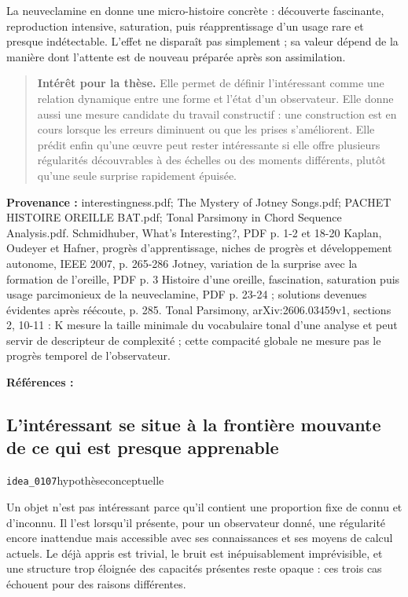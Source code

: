 \documentclass[10pt,a4paper]{article}
\begin{document}
La neuveclamine en donne une micro-histoire concrète : découverte fascinante, reproduction intensive, saturation, puis réapprentissage d'un usage rare et presque indétectable. L'effet ne disparaît pas simplement ; sa valeur dépend de la manière dont l'attente est de nouveau préparée après son assimilation.

\begin{quote}
\textbf{Intérêt pour la thèse.} Elle permet de définir l'intéressant comme une relation dynamique entre une forme et l'état d'un observateur. Elle donne aussi une mesure candidate du travail constructif : une construction est en cours lorsque les erreurs diminuent ou que les prises s'améliorent. Elle prédit enfin qu'une œuvre peut rester intéressante si elle offre plusieurs régularités découvrables à des échelles ou des moments différents, plutôt qu'une seule surprise rapidement épuisée.
\end{quote}
{\footnotesize\color{metadata}\textbf{Provenance :} interestingness.pdf; The Mystery of Jotney Songs.pdf; PACHET HISTOIRE OREILLE BAT.pdf; Tonal Parsimony in Chord Sequence Analysis.pdf. Schmidhuber, What's Interesting?, PDF p. 1-2 et 18-20 Kaplan, Oudeyer et Hafner, progrès d'apprentissage, niches de progrès et développement autonome, IEEE 2007, p. 265-286 Jotney, variation de la surprise avec la formation de l'oreille, PDF p. 3 Histoire d'une oreille, fascination, saturation puis usage parcimonieux de la neuveclamine, PDF p. 23-24 ; solutions devenues évidentes après réécoute, p. 285. Tonal Parsimony, arXiv:2606.03459v1, sections 2, 10-11 : K mesure la taille minimale du vocabulaire tonal d'une analyse et peut servir de descripteur de complexité ; cette compacité globale ne mesure pas le progrès temporel de l'observateur.\par}
{\footnotesize\color{metadata}\textbf{Références :} \parencite{schmidhuber1997interesting,schmidhuber2009compression,oudeyer2007intrinsic,oudeyer2007typology,pachet2018oreille,pachet2026tonalparsimony}\par}

\subsection{L'intéressant se situe à la frontière mouvante de ce qui est presque apprenable}
{\small\color{metadata} \texttt{idea\_0107}\quad\textbullet\quad hypothèse\quad\textbullet\quad conceptuelle\par}

Un objet n'est pas intéressant parce qu'il contient une proportion fixe de connu et d'inconnu. Il l'est lorsqu'il présente, pour un observateur donné, une régularité encore inattendue mais accessible avec ses connaissances et ses moyens de calcul actuels. Le déjà appris est trivial, le bruit est inépuisablement imprévisible, et une structure trop éloignée des capacités présentes reste opaque : ces trois cas échouent pour des raisons différentes.
\end{document}
